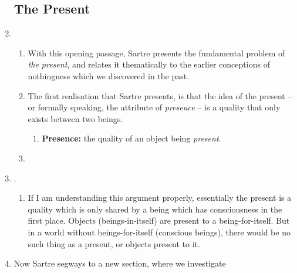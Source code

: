 \begin{enumerate}
  \subsection*{The Present}
  \item {}
  \begin{enumerate}
    \item With this opening passage, Sartre presents the fundamental problem of \emph{the present}, and relates it thematically to the earlier conceptions of nothingness which we discovered in the past.
    \item The first realisation that Sartre presents, is that the idea of the present -- or formally speaking, the attribute of \emph{presence} -- is a quality that only exists between two beings.
    \begin{enumerate}
      \item \textbf{Presence:} the quality of an object being \emph{present}.
    \end{enumerate}
    \item {}
  \end{enumerate}
  \item {}.
  \begin{enumerate}
    \item If I am understanding this argument properly, essentially the present is a quality which is only shared by a being which has consciousness in the first place. Objects (beings-in-itself) are present to a being-for-itself. But in a world without beings-for-itself (conscious beings), there would be no such thing as a present, or objects present to it.
  \end{enumerate}
  \item Now Sartre segways to a new section, where we investigate 

\end{enumerate}
